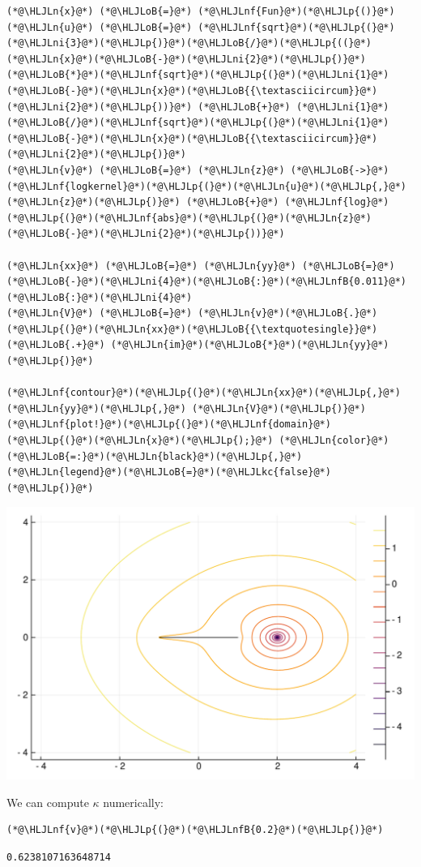 \documentclass[12pt,a4paper]{article}
\newcommand{\HLJLkc}[1]{\textcolor[RGB]{59,151,46}{\textit{#1}}}
\newcommand{\HLJLn}[1]{#1}
\newcommand{\HLJLnf}[1]{\textcolor[RGB]{66,102,213}{#1}}
\newcommand{\HLJLnfB}[1]{\textcolor[RGB]{59,151,46}{#1}}
\newcommand{\HLJLni}[1]{\textcolor[RGB]{59,151,46}{#1}}
\newcommand{\HLJLoB}[1]{\textcolor[RGB]{102,102,102}{\textbf{#1}}}
\newcommand{\HLJLp}[1]{#1}
\begin{document}
\begin{lstlisting}
(*@\HLJLn{x}@*) (*@\HLJLoB{=}@*) (*@\HLJLnf{Fun}@*)(*@\HLJLp{()}@*)
(*@\HLJLn{u}@*) (*@\HLJLoB{=}@*) (*@\HLJLnf{sqrt}@*)(*@\HLJLp{(}@*)(*@\HLJLni{3}@*)(*@\HLJLp{)}@*)(*@\HLJLoB{/}@*)(*@\HLJLp{((}@*)(*@\HLJLn{x}@*)(*@\HLJLoB{-}@*)(*@\HLJLni{2}@*)(*@\HLJLp{)}@*)(*@\HLJLoB{*}@*)(*@\HLJLnf{sqrt}@*)(*@\HLJLp{(}@*)(*@\HLJLni{1}@*)(*@\HLJLoB{-}@*)(*@\HLJLn{x}@*)(*@\HLJLoB{{\textasciicircum}}@*)(*@\HLJLni{2}@*)(*@\HLJLp{))}@*) (*@\HLJLoB{+}@*) (*@\HLJLni{1}@*)(*@\HLJLoB{/}@*)(*@\HLJLnf{sqrt}@*)(*@\HLJLp{(}@*)(*@\HLJLni{1}@*)(*@\HLJLoB{-}@*)(*@\HLJLn{x}@*)(*@\HLJLoB{{\textasciicircum}}@*)(*@\HLJLni{2}@*)(*@\HLJLp{)}@*)
(*@\HLJLn{v}@*) (*@\HLJLoB{=}@*) (*@\HLJLn{z}@*) (*@\HLJLoB{->}@*) (*@\HLJLnf{logkernel}@*)(*@\HLJLp{(}@*)(*@\HLJLn{u}@*)(*@\HLJLp{,}@*) (*@\HLJLn{z}@*)(*@\HLJLp{)}@*) (*@\HLJLoB{+}@*) (*@\HLJLnf{log}@*)(*@\HLJLp{(}@*)(*@\HLJLnf{abs}@*)(*@\HLJLp{(}@*)(*@\HLJLn{z}@*)(*@\HLJLoB{-}@*)(*@\HLJLni{2}@*)(*@\HLJLp{))}@*)

(*@\HLJLn{xx}@*) (*@\HLJLoB{=}@*) (*@\HLJLn{yy}@*) (*@\HLJLoB{=}@*) (*@\HLJLoB{-}@*)(*@\HLJLni{4}@*)(*@\HLJLoB{:}@*)(*@\HLJLnfB{0.011}@*)(*@\HLJLoB{:}@*)(*@\HLJLni{4}@*)
(*@\HLJLn{V}@*) (*@\HLJLoB{=}@*) (*@\HLJLn{v}@*)(*@\HLJLoB{.}@*)(*@\HLJLp{(}@*)(*@\HLJLn{xx}@*)(*@\HLJLoB{{\textquotesingle}}@*) (*@\HLJLoB{.+}@*) (*@\HLJLn{im}@*)(*@\HLJLoB{*}@*)(*@\HLJLn{yy}@*)(*@\HLJLp{)}@*)

(*@\HLJLnf{contour}@*)(*@\HLJLp{(}@*)(*@\HLJLn{xx}@*)(*@\HLJLp{,}@*) (*@\HLJLn{yy}@*)(*@\HLJLp{,}@*) (*@\HLJLn{V}@*)(*@\HLJLp{)}@*)
(*@\HLJLnf{plot!}@*)(*@\HLJLp{(}@*)(*@\HLJLnf{domain}@*)(*@\HLJLp{(}@*)(*@\HLJLn{x}@*)(*@\HLJLp{);}@*) (*@\HLJLn{color}@*)(*@\HLJLoB{=:}@*)(*@\HLJLn{black}@*)(*@\HLJLp{,}@*) (*@\HLJLn{legend}@*)(*@\HLJLoB{=}@*)(*@\HLJLkc{false}@*)(*@\HLJLp{)}@*)
\end{lstlisting}

\includegraphics[width=\linewidth]{figures/Lecture19_6_1.pdf}

We can compute $\kappa$ numerically:


\begin{lstlisting}
(*@\HLJLnf{v}@*)(*@\HLJLp{(}@*)(*@\HLJLnfB{0.2}@*)(*@\HLJLp{)}@*)
\end{lstlisting}

\begin{lstlisting}
0.6238107163648714
\end{lstlisting}
\end{document}

